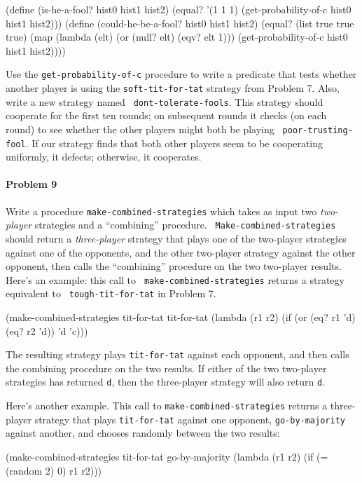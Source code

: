 \beginlisp
(define (is-he-a-fool? hist0 hist1 hist2)
  (equal? '(1 1 1) (get-probability-of-c hist0 hist1 hist2)))
\null
(define (could-he-be-a-fool? hist0 hist1 hist2)
  (equal? (list true true true)
          (map (lambda (elt) (or (null? elt) (eqv? elt 1)))
               (get-probability-of-c hist0 hist1 hist2))))
\endlisp

Use the {\tt get-probability-of-c} procedure to write a predicate that
tests whether another player is using the {\tt soft-tit-for-tat}
strategy from Problem 7. Also, write a new strategy named {\tt
dont-tolerate-fools}.  This strategy should cooperate for the first
ten rounds; on subsequent rounds it checks (on each round) to see
whether the other players might both be playing {\tt
poor-trusting-fool}.  If our strategy finds that both other players
seem to be cooperating uniformly, it defects; otherwise, it
cooperates.

\paragraph{Problem 9}
Write a procedure {\tt make-combined-strategies} which takes as input
two {\it two-player} strategies and a ``combining'' procedure.  {\tt
Make-combined-strategies} should return a {\it three-player} strategy
that plays one of the two-player strategies against one of the
opponents, and the other two-player strategy against the other
opponent, then calls the ``combining'' procedure on the two two-player
results. Here's an example: this call to {\tt
make-combined-strategies} returns a strategy equivalent to {\tt
tough-tit-for-tat} in Problem 7.

\beginlisp
(make-combined-strategies
  tit-for-tat tit-for-tat
  (lambda (r1 r2) (if (or (eq? r1 'd) (eq? r2 'd)) 'd 'c)))
\endlisp

The resulting strategy plays {\tt tit-for-tat} against each
opponent, and then calls the combining procedure on the two results.
If either of the two two-player strategies has returned {\tt d}, then
the three-player strategy will also return {\tt d}.

Here's another example. This call to {\tt make-combined-strategies}
returns a three-player strategy that plays {\tt tit-for-tat} against
one opponent, {\tt go-by-majority} against another, and chooses randomly
between the two results:

\beginlisp
(make-combined-strategies
  tit-for-tat go-by-majority
  (lambda (r1 r2) (if (= (random 2) 0) r1 r2)))
\endlisp


